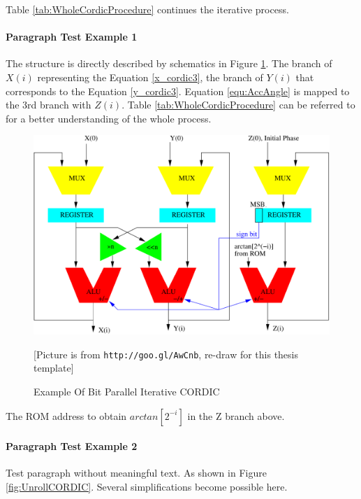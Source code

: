 Table \ref{tab:WholeCordicProcedure} continues the iterative process.




\paragraph{Paragraph Test Example 1}

The structure is directly described by schematics in Figure \ref{IterativeCORDIC}. The branch of $X(i)$ representing the Equation \ref{x_cordic3}, the branch of $Y(i)$ that corresponds to the Equation \ref{y_cordic3}. Equation \ref{equ:AccAngle} is mapped to the 3rd branch with $Z(i)$. Table \ref{tab:WholeCordicProcedure} can be referred to for a better understanding of the whole process. 

\begin{figure}[!htbp]
\begin{center}
\includegraphics[width=\textwidth]{graphic/BitParallelIterativeCORDIC.pdf}
\caption{Example Of Bit Parallel Iterative CORDIC}
{\small[Picture is from \verb|http://goo.gl/AwCnb|, re-draw for this thesis template]}
\label{IterativeCORDIC}
\end{center}
\end{figure}

The ROM address to obtain $arctan[2^{-i}]$ in the Z branch above.

\paragraph{Paragraph Test Example 2}
Test paragraph without meaningful text. As shown in Figure \ref{fig:UnrollCORDIC}. Several simplifications become possible here.

